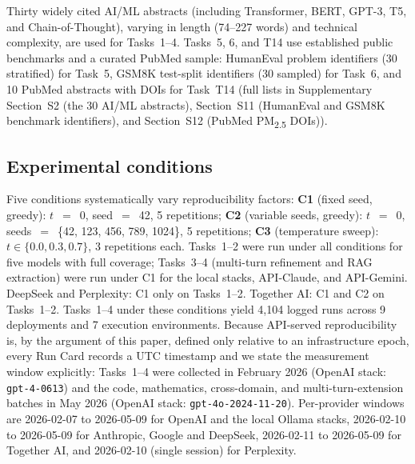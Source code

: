 \documentclass[sn-nature]{sn-jnl}
\begin{document}
Thirty widely cited AI/ML abstracts (including Transformer, BERT, GPT-3, T5, and Chain-of-Thought\cite{vaswani2017attention,devlin2019bert,brown2020language,raffel2020exploring,wei2022chain}), varying in length (74--227 words) and technical complexity, are used for Tasks~1--4.
Tasks~5, 6, and T14 use established public benchmarks and a curated PubMed sample:
HumanEval problem identifiers (30 stratified) for Task~5, GSM8K test-split identifiers (30 sampled) for Task~6, and 10 PubMed abstracts with DOIs for Task~T14 (full lists in Supplementary Section~S2 (the 30 AI/ML abstracts), Section~S11 (HumanEval and GSM8K benchmark identifiers), and Section~S12 (PubMed PM\textsubscript{2.5} DOIs)).


\subsection{Experimental conditions}\label{subsec:conditions}

Five conditions systematically vary reproducibility factors:
\textbf{C1} (fixed seed, greedy): $t$~$=$~0, seed~$=$~42, 5 repetitions;
\textbf{C2} (variable seeds, greedy): $t$~$=$~0, seeds~$=$~\{42, 123, 456, 789, 1024\}, 5 repetitions;
\textbf{C3} (temperature sweep): $t \in \{0.0, 0.3, 0.7\}$, 3 repetitions each.
Tasks~1--2 were run under all conditions for five models with full coverage; Tasks~3--4 (multi-turn refinement and RAG extraction) were run under C1 for the local stacks, API-Claude, and API-Gemini.
DeepSeek and Perplexity: C1 only on Tasks~1--2.
Together AI: C1 and C2 on Tasks~1--2.
Tasks~1--4 under these conditions yield 4{,}104 logged runs across 9 deployments and 7 execution environments.
Because API-served reproducibility is, by the argument of this paper, defined only relative to an infrastructure epoch, every Run Card records a UTC timestamp and we state the measurement window explicitly: Tasks~1--4 were collected in February 2026 (OpenAI stack: \texttt{gpt-4-0613}) and the code, mathematics, cross-domain, and multi-turn-extension batches in May 2026 (OpenAI stack: \texttt{gpt-4o-2024-11-20}). Per-provider windows are 2026-02-07 to 2026-05-09 for OpenAI and the local Ollama stacks, 2026-02-10 to 2026-05-09 for Anthropic, Google and DeepSeek, 2026-02-11 to 2026-05-09 for Together AI, and 2026-02-10 (single session) for Perplexity.
\end{document}
